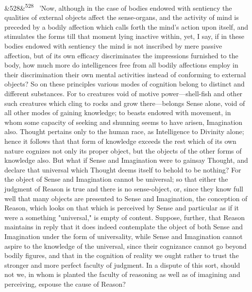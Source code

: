 \documentclass[12pt]{article}
\newcommand{\para}[1][]{\par\noindent\ifx&#1&\else\textsuperscript{\footnotesize #1}~\fi}
\begin{document}
\para[528] 'Now, although in the case of bodies endowed with sentiency the qualities of external objects affect the sense-organs, and the activity of mind is preceded by a bodily affection which calls forth the mind's action upon itself, and stimulates the forms till that moment lying inactive within, yet, I say, if in these bodies endowed with sentiency the mind is not inscribed by mere passive affection, but of its own efficacy discriminates the impressions furnished to the body, how much more do intelligences free from all bodily affections employ in their discrimination their own mental activities instead of conforming to external objects? So on these principles various modes of cognition belong to distinct and different substances. For to creatures void of motive power---shell-fish and other such creatures which cling to rocks and grow there---belongs Sense alone, void of all other modes of gaining knowledge; to beasts endowed with movement, in whom some capacity of seeking and shunning seems to have arisen, Imagination also. Thought pertains only to the human race, as Intelligence to Divinity alone; hence it follows that that form of knowledge exceeds the rest which of its own nature cognizes not only its proper object, but the objects of the other forms of knowledge also. But what if Sense and Imagination were to gainsay Thought, and declare that universal which Thought deems itself to behold to be nothing? For the object of Sense and Imagination cannot be universal; so that either the judgment of Reason is true and there is no sense-object, or, since they know full well that many objects are presented to Sense and Imagination, the conception of Reason, which looks on that which is perceived by Sense and particular as if it were a something "universal," is empty of content. Suppose, further, that Reason maintains in reply that it does indeed contemplate the object of both Sense and Imagination under the form of universality, while Sense and Imagination cannot aspire to the knowledge of the universal, since their cognizance cannot go beyond bodily figures, and that in the cognition of reality we ought rather to trust the stronger and more perfect faculty of judgment. In a dispute of this sort, should not we, in whom is planted the faculty of reasoning as well as of imagining and perceiving, espouse the cause of Reason?
\end{document}
